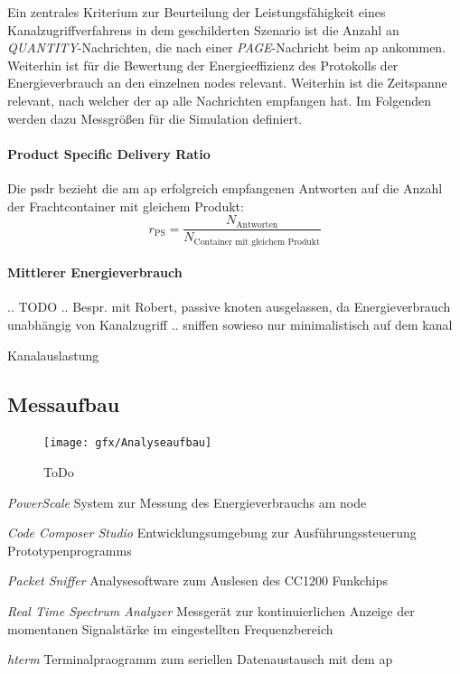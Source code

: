 Ein zentrales Kriterium zur Beurteilung der Leistungsfähigkeit eines Kanalzugriffverfahrens in dem geschilderten Szenario ist die Anzahl an \emph{QUANTITY}-Nachrichten, die nach einer \emph{PAGE}-Nachricht beim \acs{ap} ankommen. Weiterhin ist für die Bewertung der Energieeffizienz des Protokolls der Energieverbrauch an den einzelnen \glspl{node} relevant.
Weiterhin ist die Zeitspanne relevant, nach welcher der \acs{ap} alle Nachrichten empfangen hat. Im Folgenden werden dazu Messgrößen für die Simulation definiert.

\paragraph{Product Specific Delivery Ratio} Die \acf{psdr} bezieht die am \acs{ap} erfolgreich empfangenen Antworten auf die Anzahl der Frachtcontainer mit gleichem Produkt:
\begin{equation}
{r_\textrm{PS}} = \frac{N_\textrm{Antworten}}{N_\textrm{Container mit gleichem Produkt}}
\end{equation}

\paragraph{Mittlerer Energieverbrauch}
.. TODO ..
Bespr. mit Robert, 
passive knoten ausgelassen, da Energieverbrauch unabhängig von Kanalzugriff .. sniffen sowieso nur minimalistisch auf dem kanal

Kanalauslastung

\subsection{Messaufbau}\label{kap:systembeschreibung_sec:analyseaufbau}

\begin{figure}[bth]
        \myfloatalign
        {\texttt{[image: gfx/Analyseaufbau]}} 
        \caption[Ananlyseaufbau]{ToDo}\label{fig:sequenz}
\end{figure}

\begin{aenumerate}
\item \emph{PowerScale} System zur Messung des Energieverbrauchs am \gls{node}
\item \emph{Code Composer Studio} Entwicklungsumgebung zur Ausführungssteuerung Prototypenprogramms
\item \emph{Packet Sniffer} Analysesoftware zum Auslesen des CC1200 Funkchips
\item \emph{Real Time Spectrum Analyzer} Messgerät zur kontinuierlichen Anzeige der momentanen Signalstärke im eingestellten Frequenzbereich
\item \emph{hterm} Terminalpraogramm zum seriellen Datenaustausch mit dem \acs{ap}

\end{aenumerate}








